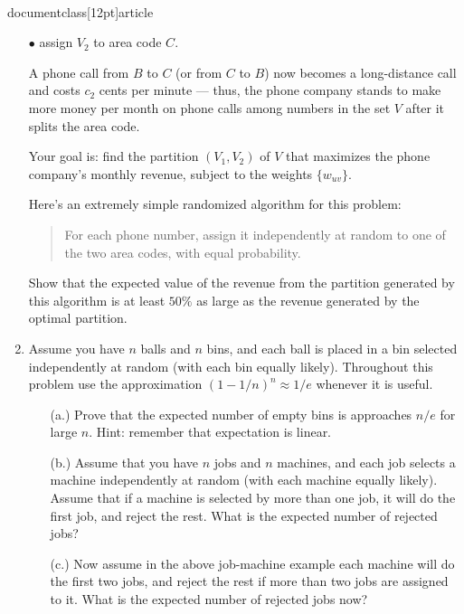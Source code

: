 \\documentclass[12pt]{article}
\begin{document}
\begin{enumerate}
$\bullet$ assign $V_2$ to area code $C$.

A phone call from $B$ to $C$ (or from $C$ to $B$)
now becomes a long-distance call and
costs $c_2$ cents per minute --- thus,
the phone company stands to make more money per month on
phone calls among numbers in the set $V$
after it splits the area code.

Your goal is: find the partition $(V_1, V_2)$ of $V$
that maximizes the phone company's monthly revenue,
subject to the weights $\{w_{uv}\}$.

Here's an extremely simple randomized algorithm for this problem:
\begin{quote}
For each phone number, assign it independently at random
to one of the two area codes, with equal probability.
\end{quote}
Show that the expected value of the revenue from the partition
generated by this algorithm is at least $50\%$
as large as the revenue generated by the optimal partition.



\item 

Assume you have $n$ balls and $n$ 
bins, and each ball is placed in a bin 
selected independently at random (with each bin equally likely). 
Throughout this problem use the approximation $(1-1/n)^n \approx 1/e$ 
whenever it is useful.      
\begin{itemize}
\item[(a.)] Prove that the expected number of empty bins 
is approaches $n/e$ for large $n$. Hint: remember that 
expectation is linear.       
\item[(b.)] Assume that you have $n$ jobs and $n$ 
machines, and each job selects a machine independently at 
random (with each machine equally likely). Assume that if 
a machine is selected by more than one job, 
it will do the first job, and reject the 
rest. What is the expected number of rejected jobs? 
\item[(c.)] Now assume in the above job-machine example each 
machine will do the first two jobs, and reject 
the rest if more than two jobs are assigned 
to it. What is the expected number of rejected 
jobs now?        
\end{itemize}


\end{enumerate}
\end{document}
